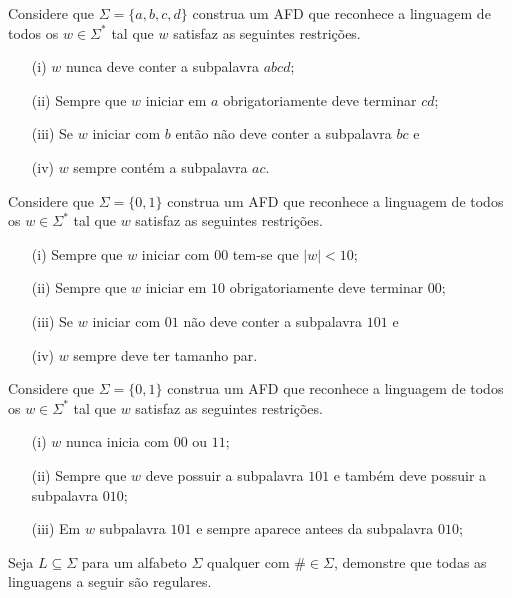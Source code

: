 \begin{questao}\label{exer:AF4}
	Considere que $\Sigma = \{a, b, c, d\}$ construa um AFD que reconhece a linguagem de todos os $w \in \Sigma^*$ tal que $w$ satisfaz as seguintes restrições.
	\begin{itemize}
		\item[(i)] $w$ nunca deve conter a subpalavra $abcd$;
		\item[(ii)] Sempre que $w$ iniciar em $a$ obrigatoriamente deve terminar $cd$;
		\item[(iii)] Se $w$ iniciar com $b$ então não deve conter a subpalavra $bc$ e 
		\item[(iv)] $w$ sempre contém a subpalavra $ac$.  
	\end{itemize}
\end{questao}


\begin{questao}\label{exer:AF5}
	Considere que $\Sigma = \{0, 1\}$ construa um AFD que reconhece a linguagem de todos os $w \in \Sigma^*$ tal que $w$ satisfaz as seguintes restrições.
	\begin{itemize}
		\item[(i)] Sempre que $w$ iniciar com $00$ tem-se que $|w| < 10$;
		\item[(ii)] Sempre que $w$ iniciar em $10$ obrigatoriamente deve terminar $00$;
		\item[(iii)] Se $w$ iniciar com $01$ não deve conter a subpalavra $101$ e 
		\item[(iv)] $w$ sempre deve ter tamanho par.  
	\end{itemize}
\end{questao}

\begin{questao}\label{exer:AF6}
	Considere que $\Sigma = \{0, 1\}$ construa um AFD que reconhece a linguagem de todos os $w \in \Sigma^*$ tal que $w$ satisfaz as seguintes restrições.
	\begin{itemize}
		\item[(i)] $w$ nunca inicia com $00$ ou $11$;
		\item[(ii)] Sempre que $w$ deve possuir a subpalavra $101$ e também deve possuir a subpalavra $010$;
		\item[(iii)] Em $w$ subpalavra $101$ e sempre aparece antees da subpalavra $010$;
	\end{itemize}
\end{questao}




\begin{questao}\label{exer:AFx}
	Seja $L \subseteq \Sigma$ para um alfabeto $\Sigma$ qualquer com $\# \in \Sigma$, demonstre que todas as linguagens a seguir são regulares.
\end{questao}


